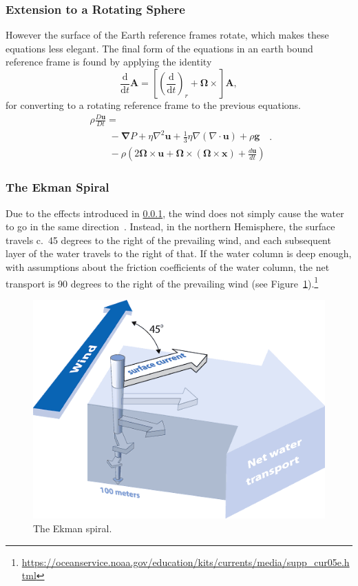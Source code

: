 \subsubsection{Extension to a Rotating Sphere}
\label{app:rotating_equations}
However the surface of the Earth reference frames rotate,
 which makes these equations less elegant.
  The final form of the equations in an earth bound reference frame
  is found by applying the identity
\begin{equation}
\frac{\mathrm{d}}{\mathrm{d} t} \boldsymbol{A}=
\left[\left(\frac{\mathrm{d}}{\mathrm{d} t}\right)_{r}
+\mathbf{\Omega} \times\right] \boldsymbol{A},
\end{equation}
for converting to a rotating reference frame to the previous equations.
\begin{equation}
\begin{array}{l}
\rho \frac{D \mathbf{u}}{D t}=\\\quad\quad-\boldsymbol{\nabla} P+
\eta \nabla^{2} \mathbf{u}+\frac{1}{3} \eta \nabla(\nabla \cdot \mathbf{u})
+\rho \mathbf{g}\\\quad\quad-\rho\left(2 \mathbf{\Omega} \times \mathbf{u}
+\mathbf{\Omega} \times(\mathbf{\Omega} \times \mathbf{x})
+\frac{d \mathbf{u}}{d t}\right)\end{array}.
\tag{R-Momentum}
\end{equation}

\subsubsection{The Ekman Spiral}

Due to the effects introduced in \cref{app:rotating_equations},
the wind does not simply cause the water to go in
the same direction~\cite{ekman1905influence}.
Instead, in the northern Hemisphere,
 the surface travels c.~45 degrees to the
right of the prevailing wind, and each subsequent
layer of the water travels to the right of that.
If the water column is deep enough, with
assumptions about the friction coefficients of the water column,
the net transport is 90 degrees to the right of the prevailing wind
(see Figure~\ref{fig:ekman}).\footnote{\url{https://oceanservice.noaa.gov/education/kits/currents/media/supp_cur05e.html}}

\begin{figure}
\includegraphics[width=\linewidth]{images/ekman_spiral.png}
\caption{The Ekman spiral.}
\label{fig:ekman}
\end{figure}
